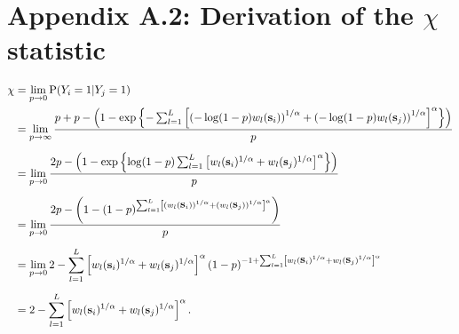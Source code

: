 \documentclass[11pt]{article}
\newcommand{\bs}{ \mbox{\bf s}}
\begin{document}
\section*{Appendix A.2: Derivation of the $\chi$ statistic}
\begin{align} \label{chi}
  \chi &= \lim_{p \rightarrow 0 }\text{P}(Y_i = 1|Y_j = 1)\nonumber \\
   &= \lim_{p \rightarrow \infty }\frac{ p + p - \left( 1 - \exp \left \{ - \sum_{ l = 1 }^{ L } \left[ \left( -\log(1-p) w_{l}(\bs_i) \right)^{ 1/\alpha } + \left( -\log(1 - p) w_{ l}(\bs_j) \right)^{ 1/\alpha } \right]^{\alpha} \right \} \right) }{ p } \nonumber \\[0.5em]
  &= \lim_{p \rightarrow 0 } \frac{ 2p - \left( 1 - \exp \left \{ \log(1-p) \sum_{ l = 1 }^{ L } \left[  w_{l}(\bs_i) ^{ 1/\alpha } +  w_{ l}(\bs_j) ^{ 1/\alpha } \right]^{\alpha} \right \} \right) }{ p } \nonumber \\[0.5em]
  &= \lim_{p \rightarrow 0 } \frac{ 2p - \left( 1 - (1-p)^{ \sum_{ l = 1 }^{ L } \left[ \left( w_{l}(\bs_i) \right)^{ 1/\alpha } + \left( w_{ l}(\bs_j) \right)^{ 1/\alpha } \right]^\alpha } \right) }{ p } \nonumber \\[0.5em]
  &=\lim_{p \rightarrow 0 } 2 -\sum_{ l = 1 }^{ L } \left[ w_{l}(\bs_i) ^{ 1/\alpha } +  w_{ l} (\bs_j)^{ 1/\alpha } \right]^\alpha ( 1 - p)^{ -1 + \sum_{ l = 1 }^{ L } \left[  w_{l}(\bs_i) ^{ 1/\alpha } +  w_{ l}(\bs_j)^{ 1/\alpha } \right]^\alpha } \nonumber \\[0.5em]
  &= 2 -  \sum_{ l = 1 }^{ L } \left[ w_{l}(\bs_i)^{ 1/\alpha } +  w_{ l}(\bs_j) ^{ 1/\alpha } \right]^\alpha.
\end{align}

\begin{singlespace}


\end{singlespace}
\end{document}
